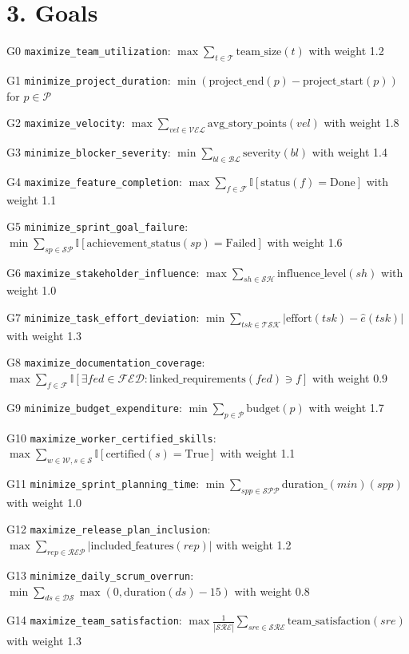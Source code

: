 \documentclass[12pt]{article}
\begin{document}
\section{3. Goals}
\item[G0] \texttt{maximize\_team\_utilization}: $ \max \sum_{t \in \mathcal{T}} \text{team\_size}(t) $ with weight 1.2
    \item[G1] \texttt{minimize\_project\_duration}: $ \min (\text{project\_end}(p) - \text{project\_start}(p)) $ for $ p \in \mathcal{P} $
    \item[G2] \texttt{maximize\_velocity}: $ \max \sum_{vel \in \mathcal{VEL}} \text{avg\_story\_points}(vel) $ with weight 1.8
    \item[G3] \texttt{minimize\_blocker\_severity}: $ \min \sum_{bl \in \mathcal{BL}} \text{severity}(bl) $ with weight 1.4
    \item[G4] \texttt{maximize\_feature\_completion}: $ \max \sum_{f \in \mathcal{F}} \mathbb{I}[\text{status}(f) = \text{Done}] $ with weight 1.1
    \item[G5] \texttt{minimize\_sprint\_goal\_failure}: $ \min \sum_{sp \in \mathcal{SP}} \mathbb{I}[\text{achievement\_status}(sp) = \text{Failed}] $ with weight 1.6
    \item[G6] \texttt{maximize\_stakeholder\_influence}: $ \max \sum_{sh \in \mathcal{SH}} \text{influence\_level}(sh) $ with weight 1.0
    \item[G7] \texttt{minimize\_task\_effort\_deviation}: $ \min \sum_{tsk \in \mathcal{TSK}} |\text{effort}(tsk) - \hat{e}(tsk)| $ with weight 1.3
    \item[G8] \texttt{maximize\_documentation\_coverage}: $ \max \sum_{f \in \mathcal{F}} \mathbb{I}[\exists fed \in \mathcal{FED}: \text{linked\_requirements}(fed) \ni f] $ with weight 0.9
    \item[G9] \texttt{minimize\_budget\_expenditure}: $ \min \sum_{p \in \mathcal{P}} \text{budget}(p) $ with weight 1.7
    \item[G10] \texttt{maximize\_worker\_certified\_skills}: $ \max \sum_{w \in \mathcal{W}, s \in \mathcal{S}} \mathbb{I}[\text{certified}(s) = \text{True}] $ with weight 1.1
    \item[G11] \texttt{minimize\_sprint\_planning\_time}: $ \min \sum_{spp \in \mathcal{SPP}} \text{duration\_}(min)(spp) $ with weight 1.0
    \item[G12] \texttt{maximize\_release\_plan\_inclusion}: $ \max \sum_{rep \in \mathcal{REP}} |\text{included\_features}(rep)| $ with weight 1.2
    \item[G13] \texttt{minimize\_daily\_scrum\_overrun}: $ \min \sum_{ds \in \mathcal{DS}} \max(0, \text{duration}(ds) - 15) $ with weight 0.8
    \item[G14] \texttt{maximize\_team\_satisfaction}: $ \max \frac{1}{|\mathcal{SRE}|} \sum_{sre \in \mathcal{SRE}} \text{team\_satisfaction}(sre) $ with weight 1.3
\end{document}

